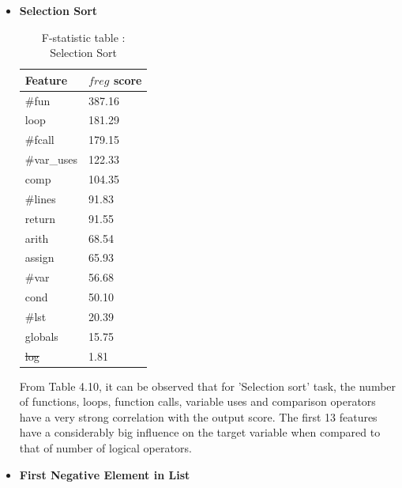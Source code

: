 \begin{itemize}
\item \textbf{Selection Sort}
  \begin{table}[H]
    \centering
    \caption{F-statistic table : Selection Sort}
    \begin{tabular}{|l|l|}
      \hline
      \textbf{Feature} & \textbf{$f{reg}$ score} \\ \hline
      \#fun            & 387.16                \\ \hline
      loop             & 181.29                \\ \hline
      \#fcall          & 179.15                \\ \hline
      \#var\_uses      & 122.33                \\ \hline
      comp             & 104.35                \\ \hline
      \#lines          & 91.83                 \\ \hline
      return           & 91.55                 \\ \hline
      arith            & 68.54                 \\ \hline
      assign           & 65.93                 \\ \hline
      \#var            & 56.68                 \\ \hline
      cond             & 50.10                 \\ \hline
      \#lst            & 20.39                 \\ \hline
      globals          & 15.75                 \\ \hline
      \st{log}              & 1.81                  \\ \hline
    \end{tabular}
            
    \label{ss_f}
  \end{table}
            
  From Table 4.10, it can be observed that for 'Selection
  sort' task, the number of functions, loops, function calls,
  variable uses and comparison operators have a very strong
  correlation with the output score. The first 13 features
  have a considerably big influence on the target variable
  when compared to that of number of logical operators.
            
\item \textbf{First Negative Element in List}


\end{itemize}
